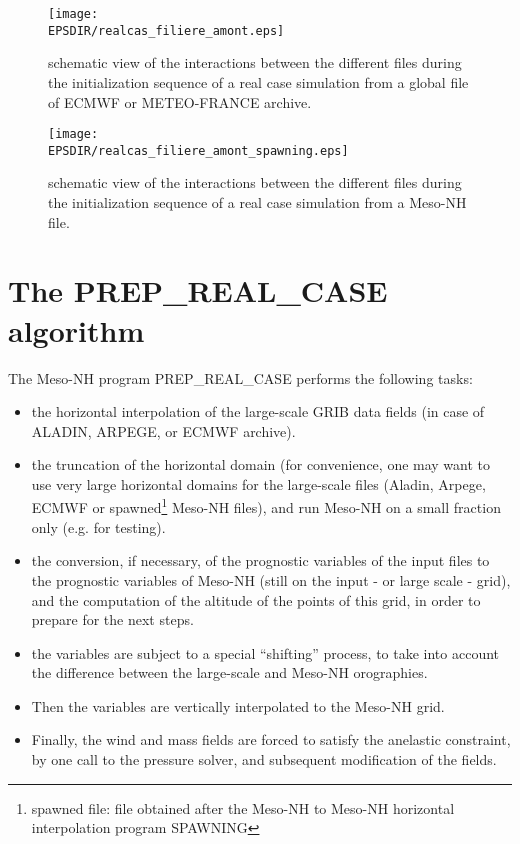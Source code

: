 \begin{figure}[!ht]
\centerline{\texttt{[image: \\EPSDIR/realcas\_filiere\_amont.eps]}}
\caption{schematic view of the interactions between the different files
during the initialization sequence of a real case simulation from a global file
of ECMWF or METEO-FRANCE archive.
\label{schematicsequence}}
\end{figure}

\begin{figure}[!ht]
\centerline{\texttt{[image: \\EPSDIR/realcas\_filiere\_amont\_spawning.eps]}}
\caption{schematic view of the interactions between the different files
during the initialization sequence of a real case simulation from a Meso-NH file.
\label{schematicsequence2}}
\end{figure}


\clearpage

\section{The PREP\_REAL\_CASE algorithm}

The Meso-NH program PREP\_REAL\_CASE performs the following tasks:
\begin{itemize}
\item the horizontal interpolation of the large-scale GRIB data fields
(in case of ALADIN, ARPEGE, or ECMWF archive).
\item the truncation of the horizontal domain (for convenience, one may want
to use very large horizontal domains for the large-scale files
(Aladin, Arpege, ECMWF or spawned\footnote{spawned file: file obtained after the
Meso-NH to Meso-NH horizontal interpolation program SPAWNING} Meso-NH files),
and run Meso-NH on a small fraction only (e.g. for testing).
\item the conversion, if necessary, of the prognostic variables of the input files to the
prognostic variables of Meso-NH (still on the input - or large scale - grid), and the
computation of the altitude of the points of this grid, in order to
prepare for the next steps.
\item the variables are subject to a special ``shifting'' process,
to take into account the difference between the large-scale and Meso-NH orographies.
\item Then the variables are vertically interpolated to the Meso-NH grid.
\item Finally, the wind and mass fields are forced to satisfy the
anelastic constraint, by one call to the pressure solver, and subsequent
modification of the fields.
\end{itemize}


